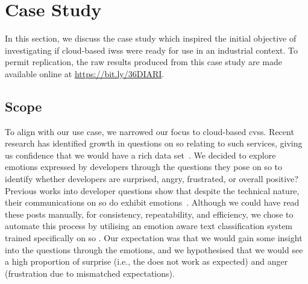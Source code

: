 \section{Case Study}\label{caise2021:sec:study}
In this section, we discuss the case study which inspired the initial objective of investigating if cloud-based \glspl{iws} were ready for use in an industrial context. To permit replication, the raw results produced from this case study are made available online at \url{https://bit.ly/36DIARI}.

\subsection{Scope} 
To align with our use case, we narrowed our focus to cloud-based \glspl{cvs}. Recent research has identified growth in questions on \gls{so} relating to such services, giving us confidence that we would have a rich data set~\citep{Cummaudo:2020icse}.  We decided to explore emotions expressed by developers through the questions they pose on \gls{so} to identify whether developers are surprised, angry, frustrated, or overall positive? Previous works into developer questions show that despite the technical nature, their communications on \gls{so} do exhibit emotions~\citep{Novielli:2015vda, calefato2017}.  Although we could have read these posts manually, for consistency, repeatability, and efficiency, we chose to automate this process by utilising an emotion aware text classification system trained specifically on \gls{so} \citep{novielli2018}. Our expectation was that we would gain some insight into the questions through the emotions, and we hypothesised that we would see a high proportion of surprise (i.e., the  does not work as expected) and anger (frustration due to mismatched expectations).


